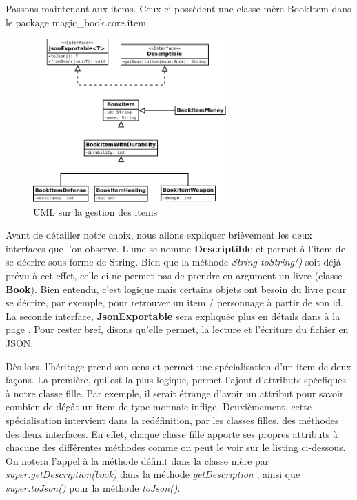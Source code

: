 			Passons maintenant aux items. Ceux-ci possèdent une classe mère BookItem dans le package magic\_book.core.item.

			\begin{figure}[H]
				\centering\includegraphics[width=0.66\textwidth, keepaspectratio]{img/book_item.png}
				\caption{UML sur la gestion des items}
			\end{figure}

			Avant de détailler notre choix, nous allons expliquer brièvement les deux interfaces que l'on observe. L'une se nomme \textbf{Descriptible} et permet à l'item de se décrire sous forme de String. Bien que la méthode \textit{String toString()} soit déjà prévu à cet effet, celle ci ne permet pas de prendre en argument un livre (classe \textbf{Book}). Bien entendu, c'est logique mais certains objets ont besoin du livre pour se décrire, par exemple, pour retrouver un item / personnage à partir de son id. La seconde interface, \textbf{JsonExportable} sera expliquée plus en détails dans  à la page \pageref{subsec:lecture_ecriture_fichier}. Pour rester bref, disons qu'elle permet, la lecture et l'écriture du fichier en JSON.

			Dès lors, l'héritage prend son sens et permet une spécialisation d'un item de deux façons. La première, qui est la plus logique, permet l'ajout d'attributs spécfiques à notre classe fille. Par exemple, il serait étrange d'avoir un attribut pour savoir combien de dégât un item de type monnaie inflige. Deuxièmement, cette spécialisation intervient dans la redéfinition, par les classes filles, des méthodes des deux interfaces. En effet, chaque classe fille apporte ses propres attributs à chacune des différentes méthodes comme on peut le voir sur le listing ci-dessous. On notera l'appel à la méthode définit dans la classe mère par \textit{super.getDescription(book)} dans la méthode \textit{getDescription} , ainsi que \textit{super.toJson()} pour la méthode \textit{toJson()}.

